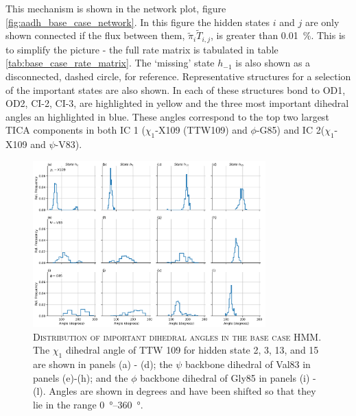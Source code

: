  This mechanism is shown in the network plot, figure \ref{fig:aadh_base_case_network}. In this figure the hidden states $i$ and $j$ are only shown connected if the flux between them, $\tilde{\pi}_{i}\tilde{T}_{i,j}$, is greater than \SI{0.01}{\percent}. This is to simplify the picture - the full rate matrix is tabulated in table \ref{tab:base_case_rate_matrix}. The `missing' state $h_{-1}$ is also shown as a disconnected, dashed circle, for reference. Representative structures for a selection of the important states are also shown. In each of these structures bond to OD1, OD2, CI-2, CI-3, are highlighted in yellow and the three most important dihedral angles an highlighted in blue. These angles correspond to the top two largest TICA components in both IC 1 ($\chi_1$-X109 (TTW109) and $\phi$-G85) and IC 2($\chi_1$-X109 and $\psi$-V83). 
 
\begin{figure}
    \centering
    \caption[Distribution of important dihedral angles in the base case HMM]{\textsc{Distribution of important dihedral angles in the base case HMM}. The $\chi_{1}$ dihedral angle of TTW 109 for hidden state 2, 3, 13, and 15 are shown in panels (a) - (d); the $\psi$ backbone dihedral of Val83 in panels (e)-(h); and the $\phi$ backbone dihedral of Gly85 in panels (i) - (l). Angles are shown in degrees and have been shifted so that they lie in the range \SIrange{0}{360}{\degree}.}
    \label{fig:aadh_base_case_dihedrals}
    \includegraphics[width=0.8\textwidth]{chapters/aadh/figures/base_case_important_dihedrals.png}
\end{figure}

